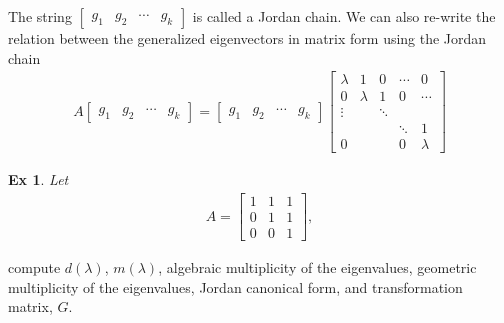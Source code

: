 \documentclass[twoside]{article}
\newtheorem{exmp}[theorem]{Ex}
\begin{document}
%
The string $\left[ \begin{array}{cccc}  g_1 & g_2 & \cdots & g_k \end{array} \right]$ is called a Jordan chain. We can also re-write the relation between 
the generalized eigenvectors in matrix form using the Jordan chain
%
\begin{align*}
	A \left[ \begin{array}{cccc}  g_1 & g_2 & \cdots & g_k \end{array} \right] = \left[ \begin{array}{cccc}  g_1 & g_2 & \cdots & g_k \end{array} \right] 
	\left[  \begin{array}{ccccc} \lambda & 1 & 0 & \cdots & 0  \\ 0 & \lambda & 1 & 0 & \cdots  \\ 
\vdots &  & \ddots &  \\ & & & \ddots & 1 \\
0 &  &  & 0 & \lambda \end{array} \right]
\end{align*}

\begin{exmp}
	Let 
\begin{align*}
A = \left[ \begin{array}{ccc} 1 & 1 & 1 \\ 0 & 1 & 1 \\ 0 & 0 & 1
\end{array} \right] , 
\end{align*}
\end{exmp}
%
compute $d(\lambda)$, $m(\lambda)$, algebraic multiplicity of the eigenvalues, geometric multiplicity of the eigenvalues, Jordan canonical form, and transformation matrix, $G$.
\end{document}
